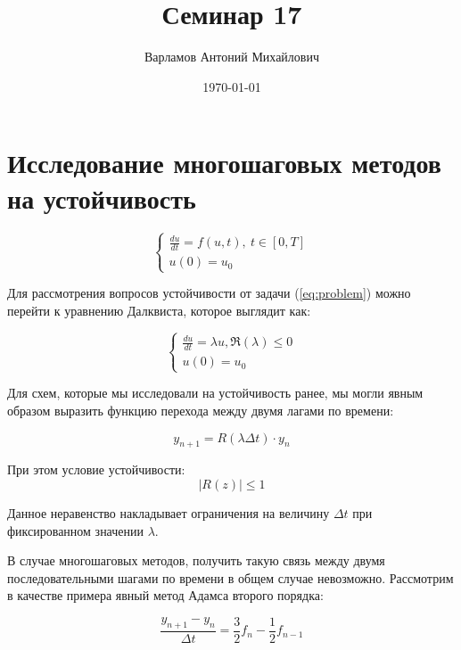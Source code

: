 \documentclass[10pt,a4paper]{article}
\title{Семинар 17}
\date{\today}
\author{Варламов Антоний Михайлович}
\begin{document}
		\maketitle

	\section{Исследование многошаговых методов на устойчивость}	
	
	\begin{equation}\label{eq:problem}
		\begin{cases}
			\frac{d{u}}{dt} = {f}\left(u, t\right), \ t\in[0, T]
			\\
			{u}\left(0\right) = {u}_{0}
		\end{cases}
	\end{equation}
	
	Для рассмотрения вопросов устойчивости от задачи (\ref{eq:problem}) можно 
	перейти к уравнению Далквиста, которое выглядит как:
	
	\begin{equation}
			\begin{cases}
				\frac{du}{dt} = \lambda u, \Re\left(\lambda\right) \leqslant 0
				\\
				u\left(0\right) = u_{0}
			\end{cases}
	\end{equation}
	
	Для схем, которые мы исследовали на устойчивость ранее, мы могли явным 
	образом выразить функцию перехода между двумя лагами по времени:
	
	\begin{equation}
		y_{n + 1} = R\left(\lambda\Delta t\right) \cdot y_{n}
	\end{equation}
	
	При этом условие устойчивости: 
	\begin{equation}
		\left|R\left(z\right)\right| \leqslant 1
	\end{equation}
	
	Данное неравенство накладывает ограничения на величину $\Delta t$ при 
	фиксированном значении $\lambda$.
	
	В случае многошаговых методов, получить такую связь между двумя 
	последовательными шагами по времени в общем случае невозможно. Рассмотрим в 
	качестве примера явный метод Адамса второго порядка:
	
	\begin{equation}
		\frac{y_{n + 1} - y_{n}}{\Delta t} = \frac{3}{2}f_{n} - \frac{1}{2}f_{n 
		- 1}
	\end{equation}
	
\end{document}
